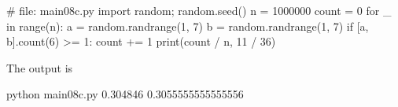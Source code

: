 \begin{console}[frame=single,fontsize=\footnotesize]
# file: main08c.py
import random; random.seed()
n = 1000000
count = 0
for _ in range(n):
    a = random.randrange(1, 7)
    b = random.randrange(1, 7)
    if [a, b].count(6) >= 1:
        count += 1
print(count / n, 11 / 36)
\end{console}
The output is
\begin{console} python main08c.py
0.304846 0.3055555555555556
\end{console}

